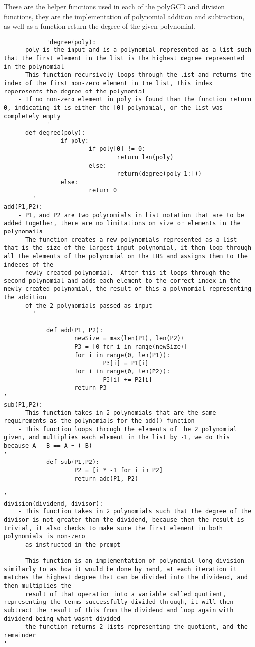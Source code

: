 \documentclass[12pt]{article}
\begin{document}
\begin{enumerate}
    These are the helper functions used in each of the polyGCD and division functions, they are the implementation of polynomial addition and subtraction, as well as a function return the degree of the given polynomial.
		\begin{lstlisting}
			'degree(poly):
    - poly is the input and is a polynomial represented as a list such that the first element in the list is the highest degree represented in the polynomial
    - This function recursively loops through the list and returns the index of the first non-zero element in the list, this index reperesents the degree of the polynomial
    - If no non-zero element in poly is found than the function return 0, indicating it is either the [0] polynomial, or the list was completely empty
			'			
      def degree(poly):
				if poly:
						if poly[0] != 0:
								return len(poly)
						else:
								return(degree(poly[1:]))
				else:
						return 0
		'	
add(P1,P2):
    - P1, and P2 are two polynomials in list notation that are to be added together, there are no limitations on size or elements in the polynomails
    - The function creates a new polynomials represented as a list that is the size of the largest input polynomial, it then loop through all the elements of the polynomial on the LHS and assigns them to the indeces of the
      newly created polynomial.  After this it loops through the second polynomial and adds each element to the correct index in the newly created polynomial, the result of this a polynomial representing the addition
      of the 2 polynomials passed as input
		'

			def add(P1, P2):
					newSize = max(len(P1), len(P2))
					P3 = [0 for i in range(newSize)]
					for i in range(0, len(P1)):
							P3[i] = P1[i]
					for i in range(0, len(P2)):
							P3[i] += P2[i]
					return P3
'
sub(P1,P2):
    - This function takes in 2 polynomials that are the same requirements as the polynomials for the add() function
    - This function loops through the elements of the 2 polynomial given, and multiplies each element in the list by -1, we do this because A - B == A + (-B)
'
			def sub(P1,P2):
					P2 = [i * -1 for i in P2]
					return add(P1, P2)
  	
'
division(dividend, divisor):
    - This function takes in 2 polynomials such that the degree of the divisor is not greater than the dividend, because then the result is trivial, it also checks to make sure the first element in both polynomials is non-zero
      as instructed in the prompt

    - This function is an implementation of polynomial long division similarly to as how it would be done by hand, at each iteration it matches the highest degree that can be divided into the dividend, and then multiplies the
      result of that operation into a variable called quotient, representing the terms successfully divided through, it will then subtract the result of this from the dividend and loop again with dividend being what wasnt divided
      the function returns 2 lists representing the quotient, and the remainder
'


\end{lstlisting}
\end{enumerate}
\end{document}
